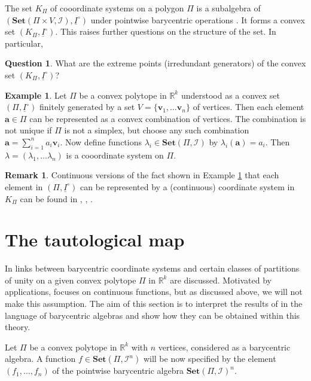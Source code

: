 \documentclass[12pt]{amsart}
\theoremstyle{plain}
\theoremstyle{definition}
\newtheorem{remark}[theorem]{Remark}
\newtheorem{example}[theorem]{Example}
\newtheorem{question}[theorem]{Question}
\numberwithin{equation}{section}
\begin{document}
The set $K_\Pi$ of cooordinate systems on a polygon $\Pi$ is a subalgebra of $(\mathbf{Set}(\Pi\times V,\mathcal{I}),\underline{I}^{\circ})$ under pointwise barycentric operations \cite[Theorem 6.6]{RSZ1}. It forms a convex set $(K_\Pi,\underline{I}^{\circ})$. This raises further questions on the structure of the set. In particular,

\begin{question}
What are the extreme points (irredundant generators) of the convex set $(K_\Pi,\underline{I}^{\circ})$?
\end{question}

\begin{example}\label{L:Kalman}
Let $\Pi$ be a convex polytope in $\mathbb{R}^k$ understood as a convex set $(\Pi,\underline{I}^\circ)$ finitely generated by a set $V=\{\mathbf v_1,\ldots \mathbf v_n\}$ of vertices. Then each element $\mathbf a\in \Pi$ can be represented as a convex combination of vertices. The combination is not unique if $\Pi$ is not a simplex, but choose any such combination $\mathbf a=\sum_{i=1}^na_i\mathbf v_i$. Now define functions $\lambda_i\in \mathbf{Set}(\Pi,\mathcal{I})$ by $\lambda_i(\mathbf a)=a_i$. Then $\lambda=(\lambda_1,\ldots \lambda_n)$ is a cooordinate system on $\Pi$.
\end{example}

\begin{remark}
Continuous versions of the fact shown in Example \ref{L:Kalman} that each element in $(\Pi,\underline{I}^\circ)$ can be represented by a (continuous) coordinate system in $K_\Pi$ can be found in \cite[Theorem~2]{K}, \cite[Theorem~9.8.1]{Modes}, \cite[Lemma 2.2]{G}.
\end{remark}



\section{The tautological map}\label{S:tm}

In \cite{G} links between barycentric coordinate systems and certain clas\-ses of partitions of unity on a given convex polytope $\Pi$ in $\mathbb{R}^k$ are discussed. Motivated by applications, \cite{G} focuses on continuous functions, but as discussed above, we will not make this assumption.
The aim of this section is to interpret the results of \cite{G} in the language of barycentric algebras and show how they can be obtained within this theory.

Let $\Pi$ be a convex polytope in $\mathbb{R}^k$ with $n$ vertices, considered as a barycentric algebra. 
A function $f\in\mathbf{Set}(\Pi,\mathcal{I}^n)$ will be now specified by the element $(f_1,\ldots ,f_n)$ of the pointwise barycentric algebra $\mathbf{Set}(\Pi,\mathcal{I})^n$.
\end{document}
